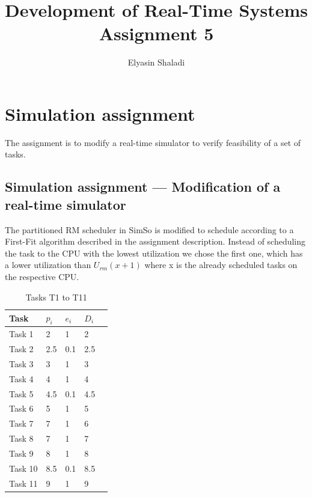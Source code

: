 \documentclass[a4paper]{article}
\begin{document}
\title{
Development of Real-Time Systems\\
Assignment 5
}
\author{Elyasin Shaladi}
\maketitle

\tableofcontents
\newpage
\listoftables
\lstlistoflistings
\listoffigures

\newpage

\section{Simulation assignment}
The assignment is to modify a real-time simulator to verify feasibility of a set of tasks.

\subsection{Simulation assignment --- Modification of a real-time simulator}

The partitioned RM scheduler in SimSo is modified to schedule according to a First-Fit algorithm described in the assignment description. Instead of scheduling the task to the CPU with the lowest utilization we chose the first one, which has a lower utilization than $U_{rm}(x+1)$ where x is the already scheduled tasks on the respective CPU.

\begin{table}[!htbp]
\begin{center}
\begin{tabular}{|l||l|l|l|l|}
\hline
Task   & $p_i$ & $e_i$ & $D_i$\\
\hline
\hline
Task 1 & 2 & 1 & 2\\
\hline
Task 2 & 2.5 & 0.1 & 2.5\\
\hline
Task 3 & 3 & 1 & 3\\
\hline
Task 4 & 4 & 1 & 4\\
\hline
Task 5 & 4.5 & 0.1 & 4.5\\
\hline
Task 6 & 5 & 1 & 5\\
\hline
Task 7 & 7 & 1 & 6\\
\hline
Task 8 & 7 & 1 & 7\\
\hline
Task 9 & 8 & 1 & 8\\
\hline
Task 10 & 8.5 & 0.1 & 8.5\\
\hline
Task 11 & 9 & 1 & 9\\
\hline
\end{tabular}
\caption{Tasks T1 to T11}
\end{center}
\end{table}
\end{document}
